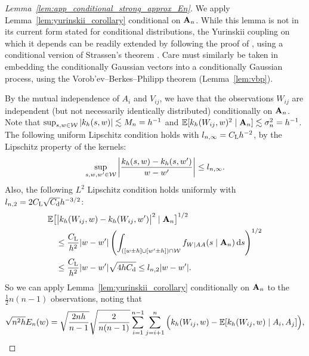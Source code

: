 \begin{proof}[Lemma~\ref{lem:app_conditional_strong_approx_En}]

  We apply Lemma~\ref{lem:yurinskii_corollary} conditional on
  $\mathbf{A}_n$. While this lemma is not in its current form
  stated for conditional distributions,
  the Yurinskii coupling on which it depends can be readily extended
  by following the proof of \citet[Lemma~38]{belloni2019conditional},
  using a conditional version of Strassen's theorem
  \cite[Theorem~B.2]{chen2020jackknife}.
  Care must similarly be taken in embedding the conditionally Gaussian vectors
  into a conditionally Gaussian process, using the
  Vorob'ev--Berkes--Philipp theorem (Lemma~\ref{lem:vbp}).

  By the mutual independence of $A_i$ and $V_{ij}$,
  we have that the observations
  $W_{ij}$ are independent
  (but not necessarily identically distributed)
  conditionally on $\mathbf{A}_n$.
  Note that
  $\sup_{s,w \in \mathcal{W}} |k_h(s,w)| \lesssim M_n = h^{-1}$
  and
  $\mathbb{E}[k_h(W_{ij},w)^2 \mid \mathbf{A}_n] \lesssim \sigma_n^2 = h^{-1}$.
  The following uniform Lipschitz condition holds
  with $l_{n,\infty} = C_\mathrm{L} h^{-2}$,
  by the Lipschitz property of the kernels:
  \begin{align*}
    \sup_{s,w,w' \in \mathcal{W}}
    \left|
    \frac{k_h(s, w) - k_h(s, w')}
    {w-w'}
    \right|
    \leq
    l_{n,\infty}.
  \end{align*}
  Also, the following $L^2$ Lipschitz condition holds
  uniformly with $l_{n,2} = 2 C_\mathrm{L} \sqrt{C_\mathrm{d}} h^{-3/2}$:
  \begin{align*}
    &\mathbb{E}\big[
      \big|
      k_h(W_{ij}, w) - k_h(W_{ij}, w')
      \big|^2
      \mid \mathbf{A}_n
      \big]^{1/2} \\
    &\quad\leq
    \frac{C_\mathrm{L}}{h^2}
    |w-w'|
    \left(
      \int_{([w \pm h] \cup [w' \pm h]) \cap \mathcal{W}}
      f_{W \mid AA}(s \mid  \mathbf{A}_n)
      \,\mathrm{d}s
    \right)^{1/2} \\
    &\quad\leq
    \frac{C_\mathrm{L}}{h^2}
    |w-w'|
    \sqrt{4h C_\mathrm{d}}
    \leq
    l_{n,2}
    |w-w'|.
  \end{align*}
  So we can apply
  Lemma~\ref{lem:yurinskii_corollary}
  conditionally on $\mathbf{A}_n$
  to the $\frac{1}{2}n(n-1)$ observations,
  noting that
  \begin{align*}
    \sqrt{n^2h} E_n(w)
    =
    \sqrt{\frac{2nh}{n-1}}
    \sqrt{\frac{2}{n(n-1)}}
    \sum_{i=1}^{n-1}
    \sum_{j=i+1}^{n}
    \Big(
    k_h(W_{ij},w)
    - \mathbb{E}[k_h(W_{ij},w)  \mid  A_i, A_j]
    \Big),
  \end{align*}

\end{proof}
